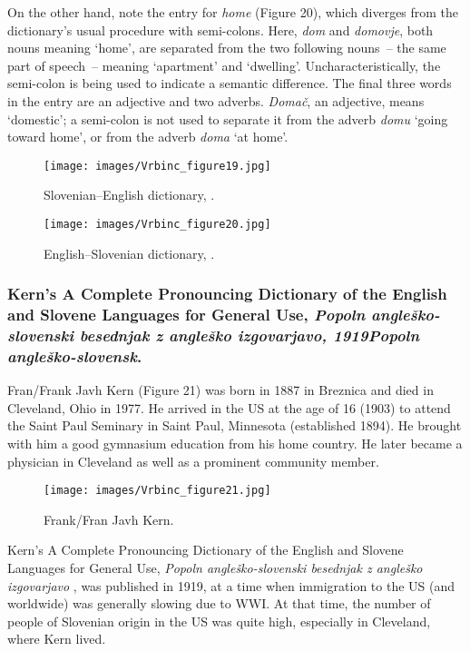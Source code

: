 \documentclass[output=paper,colorlinks,citecolor=brown,arabicfont,chinesefont]{langscibook}
\begin{document}
On the other hand, note the entry for \emph{home} (Figure 20), which diverges from the dictionary’s usual procedure with semi-colons. Here, \emph{dom} and \emph{domovje}, both nouns meaning ‘home’, are separated from the two following nouns~-- the same part of speech~-- meaning ‘apartment’ and ‘dwelling’. Uncharacteristically, the semi-colon is being used to indicate a semantic difference. The final three words in the entry are an adjective and two adverbs. \emph{Domač}, an adjective, means ‘domestic’; a semi-colon is not used to separate it from the adverb \emph{domu} ‘going toward home’, or from the adverb \emph{doma} ‘at home’.

\begin{figure}
\texttt{[image: images/Vrbinc\_figure19.jpg]}
\caption{Slovenian–English dictionary, \citep[56]{Košutnik1912}.}
\label{Figure 19}
\end{figure}

\begin{figure}
\texttt{[image: images/Vrbinc\_figure20.jpg]}
\caption{English–Slovenian dictionary, \citep[103]{Košutnik1912}.}
\label{Figure 20}
\end{figure}

\subsubsection{Kern’s A Complete Pronouncing Dictionary of the English and Slovene Languages for General Use, \emph{Popoln angleško-slovenski besednjak z angleško izgovarjavo, 1919Popoln angleško-slovensk}.}

Fran/Frank Javh Kern (Figure 21) was born in 1887 in Breznica and died in Cleveland, Ohio in 1977. He arrived in the US at the age of 16 (1903) to attend the Saint Paul Seminary in Saint Paul, Minnesota (established 1894). He brought with him a good gymnasium education from his home country. He later became a physician in Cleveland as well as a prominent community member.

\begin{figure}
\texttt{[image: images/Vrbinc\_figure21.jpg]}
\caption{Frank/Fran Javh Kern.}
\label{Figure 21}
\end{figure}

Kern’s A Complete Pronouncing Dictionary of the English and Slovene Languages for General Use, \emph{Popoln angleško-slovenski besednjak z angleško izgovarjavo} \citep{Kern1919}, was published in 1919, at a time when immigration to the US (and worldwide) was generally slowing due to WWI. At that time, the number of people of Slovenian origin in the US was quite high, especially in Cleveland, where Kern lived. 
\end{document}
